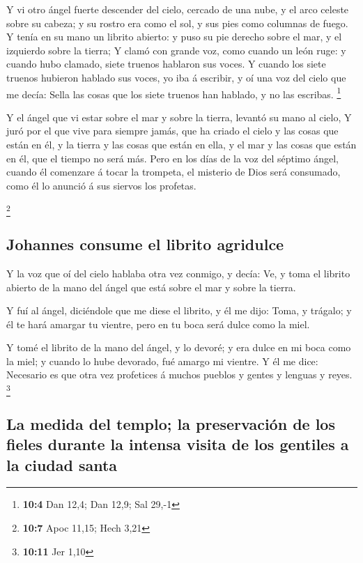  Y vi otro ángel fuerte descender del cielo, cercado de
una nube, y el arco celeste sobre su cabeza; y su rostro era como el
sol, y sus pies como columnas de fuego.  Y tenía en su
mano un librito abierto: y puso su pie derecho sobre el mar, y el
izquierdo sobre la tierra;  Y clamó con grande voz, como
cuando un león ruge: y cuando hubo clamado, siete truenos hablaron sus
voces.  Y cuando los siete truenos hubieron hablado sus
voces, yo iba á escribir, y oí una voz del cielo que me decía: Sella las
cosas que los siete truenos han hablado, y no las escribas. \footnote{\textbf{10:4}
  Dan 12,4; Dan 12,9; Sal 29,-1}

 Y el ángel que vi estar sobre el mar y sobre la tierra,
levantó su mano al cielo,  Y juró por el que vive para
siempre jamás, que ha criado el cielo y las cosas que están en él, y la
tierra y las cosas que están en ella, y el mar y las cosas que están en
él, que el tiempo no será más.  Pero en los días de la voz
del séptimo ángel, cuando él comenzare á tocar la trompeta, el misterio
de Dios será consumado, como él lo anunció á sus siervos los profetas.

\footnote{\textbf{10:7} Apoc 11,15; Hech 3,21}

\hypertarget{johannes-consume-el-librito-agridulce}{%
\subsection{Johannes consume el librito
agridulce}\label{johannes-consume-el-librito-agridulce}}

 Y la voz que oí del cielo hablaba otra vez conmigo, y
decía: Ve, y toma el librito abierto de la mano del ángel que está sobre
el mar y sobre la tierra.

 Y fuí al ángel, diciéndole que me diese el librito, y él
me dijo: Toma, y trágalo; y él te hará amargar tu vientre, pero en tu
boca será dulce como la miel.

 Y tomé el librito de la mano del ángel, y lo devoré; y
era dulce en mi boca como la miel; y cuando lo hube devorado, fué amargo
mi vientre.  Y él me dice: Necesario es que otra vez
profetices á muchos pueblos y gentes y lenguas y reyes. \footnote{\textbf{10:11}
  Jer 1,10}

\hypertarget{la-medida-del-templo-la-preservaciuxf3n-de-los-fieles-durante-la-intensa-visita-de-los-gentiles-a-la-ciudad-santa}{%
\subsection{La medida del templo; la preservación de los fieles durante
la intensa visita de los gentiles a la ciudad
santa}\label{la-medida-del-templo-la-preservaciuxf3n-de-los-fieles-durante-la-intensa-visita-de-los-gentiles-a-la-ciudad-santa}}

